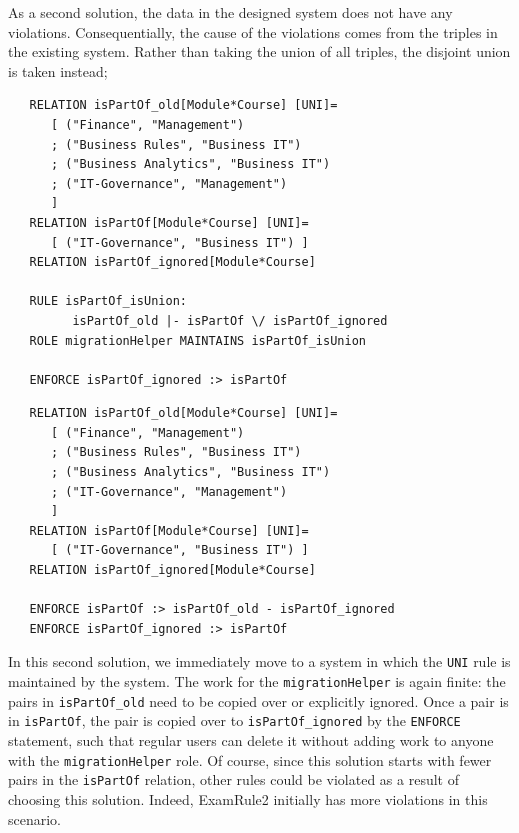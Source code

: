 \documentclass{elsarticle}
\begin{document}
As a second solution, the data in the designed system does not have any violations.
Consequentially, the cause of the violations comes from the triples in the existing system.
Rather than taking the union of all triples, the disjoint union is taken instead;
\begin{verbatim}
   RELATION isPartOf_old[Module*Course] [UNI]=
      [ ("Finance", "Management")
      ; ("Business Rules", "Business IT")
      ; ("Business Analytics", "Business IT")
      ; ("IT-Governance", "Management")
      ]
   RELATION isPartOf[Module*Course] [UNI]=
      [ ("IT-Governance", "Business IT") ]
   RELATION isPartOf_ignored[Module*Course]
   
   RULE isPartOf_isUnion:
         isPartOf_old |- isPartOf \/ isPartOf_ignored
   ROLE migrationHelper MAINTAINS isPartOf_isUnion
   
   ENFORCE isPartOf_ignored :> isPartOf
\end{verbatim}

\begin{verbatim}
   RELATION isPartOf_old[Module*Course] [UNI]=
      [ ("Finance", "Management")
      ; ("Business Rules", "Business IT")
      ; ("Business Analytics", "Business IT")
      ; ("IT-Governance", "Management")
      ]
   RELATION isPartOf[Module*Course] [UNI]=
      [ ("IT-Governance", "Business IT") ]
   RELATION isPartOf_ignored[Module*Course]

   ENFORCE isPartOf :> isPartOf_old - isPartOf_ignored
   ENFORCE isPartOf_ignored :> isPartOf
\end{verbatim}
In this second solution, we immediately move to a system in which the \verb=UNI= rule is maintained by the system.
The work for the \verb=migrationHelper= is again finite: the pairs in \verb=isPartOf_old= need to be copied over or explicitly ignored.
Once a pair is in \verb=isPartOf=, the pair is copied over to \verb=isPartOf_ignored= by the \verb=ENFORCE= statement, such that regular users can delete it without adding work to anyone with the \verb=migrationHelper= role.
Of course, since this solution starts with fewer pairs in the \verb=isPartOf= relation, other rules could be violated as a result of choosing this solution.
Indeed, ExamRule2 initially has more violations in this scenario.
\end{document}
